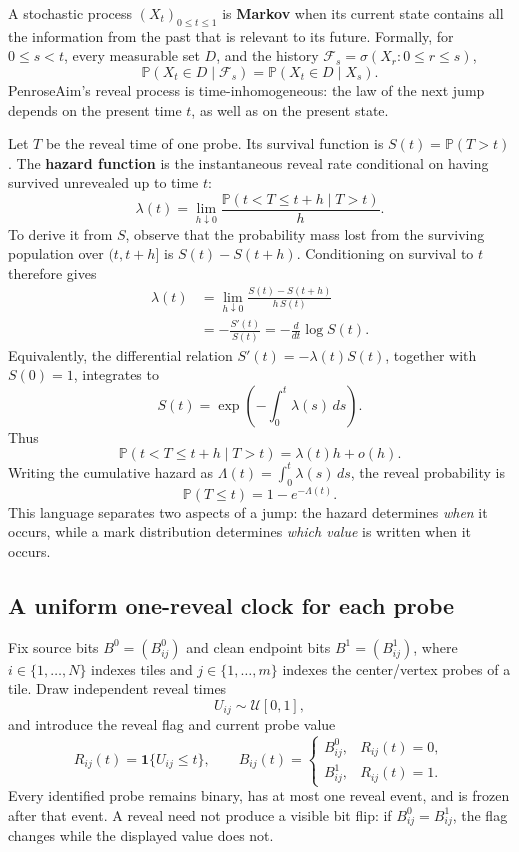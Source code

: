 \documentclass[11pt]{article}
\newcommand{\Pp}{\mathbb{P}}
\newcommand{\1}{\mathbf{1}}
\newcommand{\term}[1]{\textcolor{AimBlue}{\textbf{#1}}}
\begin{document}
A stochastic process \((X_t)_{0\le t\le1}\) is \term{Markov} when its current
state contains all the information from the past that is relevant to its
future.  Formally, for \(0\le s<t\), every measurable set \(D\), and the
history \(\mathcal F_s=\sigma(X_r:0\le r\le s)\),
\[
  \Pp(X_t\in D\mid\mathcal F_s)
  =\Pp(X_t\in D\mid X_s).
\]
PenroseAim's reveal process is time-inhomogeneous: the law of the next jump
depends on the present time \(t\), as well as on the present state.

Let \(T\) be the reveal time of one probe.  Its survival function is
\(S(t)=\Pp(T>t)\).  The \term{hazard function} is the instantaneous reveal rate
conditional on having survived unrevealed up to time \(t\):
\[
  \lambda(t)
  =\lim_{h\downarrow0}
    \frac{\Pp(t<T\le t+h\mid T>t)}{h}.
\]
To derive it from \(S\), observe that the probability mass lost from the
surviving population over \((t,t+h]\) is \(S(t)-S(t+h)\).  Conditioning on
survival to \(t\) therefore gives
\[
\begin{aligned}
  \lambda(t)
  &=\lim_{h\downarrow0}
    \frac{S(t)-S(t+h)}{h\,S(t)}\\
  &=-\frac{S'(t)}{S(t)}
   =-\frac{d}{dt}\log S(t).
\end{aligned}
\]
Equivalently, the differential relation \(S'(t)=-\lambda(t)S(t)\), together
with \(S(0)=1\), integrates to
\[
  S(t)=\exp\!\left(-\int_0^t\lambda(s)\,ds\right).
\]
Thus
\[
  \Pp(t<T\le t+h\mid T>t)=\lambda(t)h+o(h).
\]
Writing the cumulative hazard as
\(\Lambda(t)=\int_0^t\lambda(s)\,ds\), the reveal probability is
\[
  \Pp(T\le t)=1-e^{-\Lambda(t)}.
\]
This language separates two aspects of a jump: the hazard determines
\emph{when} it occurs, while a mark distribution determines \emph{which value}
is written when it occurs.

\subsection{A uniform one-reveal clock for each probe}

Fix source bits \(B^0=(B^0_{ij})\) and clean endpoint bits
\(B^1=(B^1_{ij})\), where \(i\in\{1,\ldots,N\}\) indexes tiles and
\(j\in\{1,\ldots,m\}\) indexes the center/vertex probes of a tile.  Draw
independent reveal times
\[
  U_{ij}\sim\mathcal U[0,1],
\]
and introduce the reveal flag and current probe value
\[
  R_{ij}(t)=\1\{U_{ij}\le t\},\qquad
  B_{ij}(t)=
  \begin{cases}
    B_{ij}^0,&R_{ij}(t)=0,\\
    B_{ij}^1,&R_{ij}(t)=1.
  \end{cases}
\]
Every identified probe remains binary, has at most one reveal event, and is
frozen after that event.  A reveal need not produce a visible bit flip:
if \(B^0_{ij}=B^1_{ij}\), the flag changes while the displayed value does not.
\end{document}
